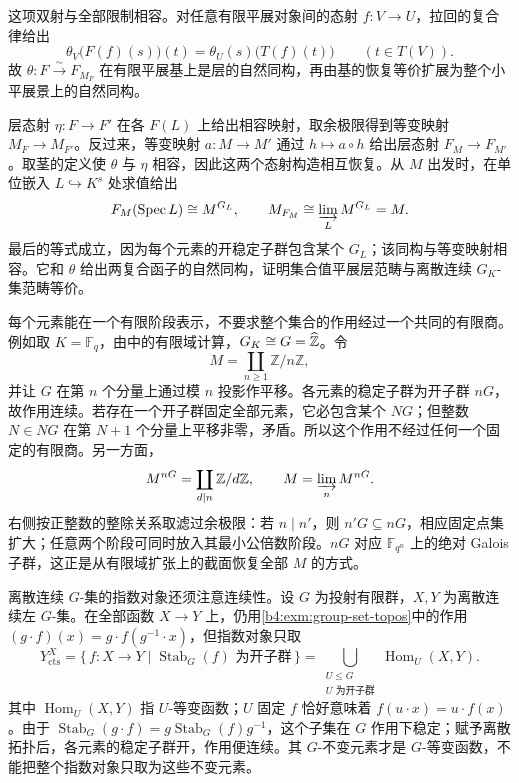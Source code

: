 \ProseParagraphBreak
这项双射与全部限制相容。对任意有限平展对象间的态射 \(f:V\rightarrow U\)，拉回的复合律给出
\[
	\theta_V\bigl(F(f)(s)\bigr)(t) =\theta_U(s)\bigl(T(f)(t)\bigr) \qquad(t\in T(V)).
\]
故 \(\theta:F\xrightarrow{\sim}F_{M_F}\) 在有限平展基上是层的自然同构，再由基的恢复等价扩展为整个小平展景上的自然同构。

\ProseParagraphBreak
层态射 \(\eta:F\rightarrow F'\) 在各 \(F(L)\) 上给出相容映射，取余极限得到等变映射 \(M_F\rightarrow M_{F'}\)。反过来，等变映射 \(a:M\rightarrow M'\) 通过 \(h\mapsto a\circ h\) 给出层态射 \(F_M\rightarrow F_{M'}\)。取茎的定义使 \(\theta\) 与 \(\eta\) 相容，因此这两个态射构造相互恢复。从 \(M\) 出发时，在单位嵌入 \(L\hookrightarrow K^s\) 处求值给出
\[
	F_M(\operatorname{Spec}L)\cong M^{G_L}, \qquad M_{F_M}\cong\varinjlim_L M^{G_L}=M.
\]
最后的等式成立，因为每个元素的开稳定子群包含某个 \(G_L\)；该同构与等变映射相容。它和 \(\theta\) 给出两复合函子的自然同构，证明集合值平展层范畴与离散连续 \(G_K\)-集范畴等价。

\ProseParagraphBreak
每个元素能在一个有限阶段表示，不要求整个集合的作用经过一个共同的有限商。例如取 \(K=\mathbb F_q\)，由中的有限域计算，\(G_K\cong G=\widehat{\vphantom{Z}\mathbb Z}\)。令
\[
	M=\coprod_{n\ge1}\mathbb Z/n\mathbb Z,
\]
并让 \(G\) 在第 \(n\) 个分量上通过模 \(n\) 投影作平移。各元素的稳定子群为开子群 \(nG\)，故作用连续。若存在一个开子群固定全部元素，它必包含某个 \(NG\)；但整数 \(N\in NG\) 在第 \(N+1\) 个分量上平移非零，矛盾。所以这个作用不经过任何一个固定的有限商。另一方面，
\[
	M^{nG}=\coprod_{d\mid n}\mathbb Z/d\mathbb Z, \qquad M=\varinjlim_n M^{nG}.
\]
右侧按正整数的整除关系取滤过余极限：若 \(n\mid n'\)，则 \(n'G\subseteq nG\)，相应固定点集扩大；任意两个阶段可同时放入其最小公倍数阶段。\(nG\) 对应 \(\mathbb F_{q^n}\) 上的绝对 Galois 子群，这正是从有限域扩张上的截面恢复全部 \(M\) 的方式。

\ProseParagraphBreak
离散连续 \(G\)-集的指数对象还须注意连续性。设 \(G\) 为投射有限群，\(X,Y\) 为离散连续左 \(G\)-集。在全部函数 \(X\to Y\) 上，仍用\cref{b4:exm:group-set-topos}中的作用 \((g\cdot f)(x)=g\cdot f(g^{-1}\cdot x)\)，但指数对象只取
\[
	Y^X_{\mathrm{cts}} =\{\,f:X\to Y\mid\operatorname{Stab}_G(f)\text{ 为开子群}\,\} =\bigcup_{\substack{U\le G\\U\text{ 为开子群}}}\operatorname{Hom}_U(X,Y).
\]
其中 \(\operatorname{Hom}_U(X,Y)\) 指 \(U\)-等变函数；\(U\) 固定 \(f\) 恰好意味着 \(f(u\cdot x)=u\cdot f(x)\)。由于 \(\operatorname{Stab}_G(g\cdot f)=g\operatorname{Stab}_G(f)g^{-1}\)，这个子集在 \(G\) 作用下稳定；赋予离散拓扑后，各元素的稳定子群开，作用便连续。其 \(G\)-不变元素才是 \(G\)-等变函数，不能把整个指数对象只取为这些不变元素。

